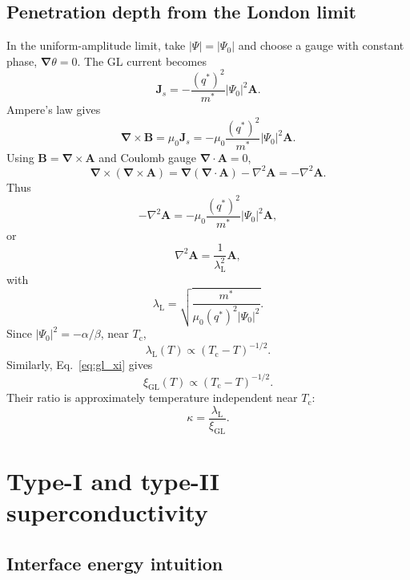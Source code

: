 \documentclass[11pt]{article}
\numberwithin{equation}{section}
\newcommand{\Avec}{\bm{A}}
\newcommand{\Bvec}{\bm{B}}
\newcommand{\Jvec}{\bm{J}}
\renewcommand{\grad}{\bm{\nabla}}
\newcommand{\lap}{\nabla^2}
\newcommand{\Tc}{T_{\mathrm{c}}}
\newcommand{\xiGL}{\xi_{\mathrm{GL}}}
\newcommand{\lambdaL}{\lambda_{\mathrm{L}}}
\newcommand{\Ord}{\Psi}
\begin{document}
\subsection{Penetration depth from the London limit}

In the uniform-amplitude limit, take $|\Ord|=|\Ord_0|$ and choose a gauge with constant phase, $\grad\theta=0$. The GL current becomes
\begin{equation}
\Jvec_s=-\frac{(q^*)^2}{m^*}|\Ord_0|^2\Avec.
\end{equation}
Ampere's law gives
\begin{equation}
\grad\times\Bvec=\mu_0\Jvec_s=-\mu_0\frac{(q^*)^2}{m^*}|\Ord_0|^2\Avec.
\end{equation}
Using $\Bvec=\grad\times\Avec$ and Coulomb gauge $\grad\cdot\Avec=0$,
\begin{equation}
\grad\times(\grad\times\Avec)=\grad(\grad\cdot\Avec)-\lap\Avec=-\lap\Avec.
\end{equation}
Thus
\begin{equation}
-\lap\Avec=-\mu_0\frac{(q^*)^2}{m^*}|\Ord_0|^2\Avec,
\end{equation}
or
\begin{equation}
\lap\Avec=\frac{1}{\lambdaL^2}\Avec,
\end{equation}
with
\begin{equation}
\boxed{\lambdaL=\sqrt{\frac{m^*}{\mu_0(q^*)^2|\Ord_0|^2}}.}
\label{eq:lambda_GL}
\end{equation}
Since $|\Ord_0|^2=-\alpha/\beta$, near $\Tc$,
\begin{equation}
\lambdaL(T)\propto (\Tc-T)^{-1/2}.
\end{equation}
Similarly, Eq.~\eqref{eq:gl_xi} gives
\begin{equation}
\xiGL(T)\propto (\Tc-T)^{-1/2}.
\end{equation}
Their ratio is approximately temperature independent near $\Tc$:
\begin{equation}
\boxed{\kappa=\frac{\lambdaL}{\xiGL}.}
\end{equation}

\section{Type-I and type-II superconductivity}

\subsection{Interface energy intuition}
\end{document}
